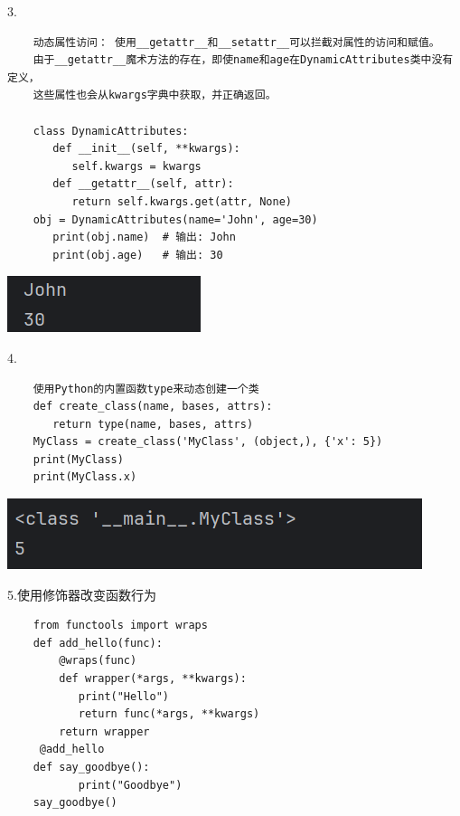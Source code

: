 \documentclass{article}
\begin{document}
3.
\begin{verbatim}
    动态属性访问： 使用__getattr__和__setattr__可以拦截对属性的访问和赋值。
    由于__getattr__魔术方法的存在，即使name和age在DynamicAttributes类中没有定义，
    这些属性也会从kwargs字典中获取，并正确返回。

    class DynamicAttributes:
       def __init__(self, **kwargs):
          self.kwargs = kwargs
       def __getattr__(self, attr):
          return self.kwargs.get(attr, None)
    obj = DynamicAttributes(name='John', age=30)
       print(obj.name)  # 输出: John
       print(obj.age)   # 输出: 30
\end{verbatim}


\noindent
\begin{minipage}{\linewidth}
  \centering
  \includegraphics[width=0.5\linewidth]{学习11.png}
  \label{fig:example}
\end{minipage}

4.
\begin{verbatim} 
    使用Python的内置函数type来动态创建一个类
    def create_class(name, bases, attrs):
       return type(name, bases, attrs)
    MyClass = create_class('MyClass', (object,), {'x': 5})
    print(MyClass)
    print(MyClass.x)
\end{verbatim}

\noindent
\begin{minipage}{\linewidth}
  \centering
  \includegraphics[width=0.5\linewidth]{学习12.png}
  \label{fig:example}
\end{minipage}

5.使用修饰器改变函数行为
\begin{verbatim}
    from functools import wraps
    def add_hello(func):
        @wraps(func)
        def wrapper(*args, **kwargs):
           print("Hello")
           return func(*args, **kwargs)
        return wrapper
     @add_hello
    def say_goodbye():
           print("Goodbye")
    say_goodbye()
\end{verbatim}
\end{document}
